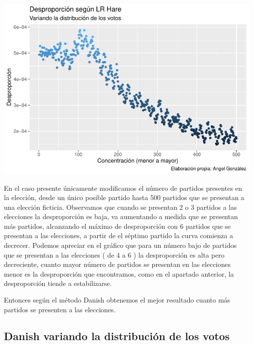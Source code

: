 \documentclass[12pt,a4paper,]{book}
\numberwithin{dummy}{section}
\theoremstyle{ocrenumbox}
\theoremstyle{blacknumex}
\theoremstyle{blacknumbox}
\theoremstyle{ocrenum}
\theoremstyle{ocrenum}
\begin{document}
\begin{center}\includegraphics[width=0.95\linewidth]{figurasR/unnamed-chunk-43-1} \end{center}

En el caso presente únicamente modificamos el número de partidos
presentes en la elección, desde un único posible partido hasta 500
partidos que se presentan a una elección ficticia. Observamos que cuando
se presentan 2 o 3 partidos a las elecciones la desproporción es baja,
va aumentando a medida que se presentan más partidos, alcanzando el
máximo de desproporción con 6 partidos que se presentan a las
elecciones, a partir de el séptimo partido la curva comienza a decrecer.
Podemos apreciar en el gráfico que para un número bajo de partidos que
se presentan a las elecciones ( de 4 a 6 ) la desproporción es alta pero
decreciente, cuanto mayor número de partidos se presentan en las
elecciones menor es la desproporción que encontramos, como en el
apartado anterior, la desproporción tiende a estabilizarse.

Entonces según el método Danish obtenemos el mejor resultado cuanto más
partidos se presenten a las elecciones.

\hypertarget{danish-variando-la-distribuciuxf3n-de-los-votos}{%
\subsection{Danish variando la distribución de los
votos}\label{danish-variando-la-distribuciuxf3n-de-los-votos}}
\end{document}
